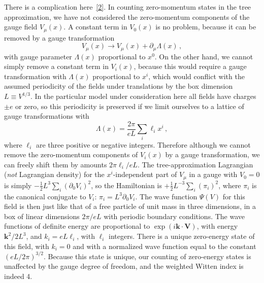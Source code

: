 There is a complication here~\hyperref[ch29-ref-2]{[2]}. In counting
zero-momentum states in the tree approximation, we have not considered the
zero-momentum components of the gauge field \(V_\mu(x)\). A constant term
in \(V_0(x)\) is no problem, because it can be removed by a gauge
transformation
\begin{equation}
  V_\mu(x)\longrightarrow V_\mu(x)+\partial_\mu\Lambda(x)\,,
  \tag{29.4.2}\label{eq:29.4.2}
\end{equation}
with gauge parameter \(\Lambda(x)\) proportional to \(x^0\). On the other
hand, we cannot simply remove a constant term in \(V_i(x)\), because this
would require a gauge transformation with \(\Lambda(x)\) proportional to
\(x^i\), which would conflict with the assumed periodicity of the fields
under translations by the box dimension \(L\equiv V^{1/3}\). In the
particular model under consideration here all fields have charges \(\pm e\)
or zero, so this periodicity is preserved if we limit ourselves to a lattice
of gauge transformations with
\begin{equation}
  \Lambda(x)=\frac{2\pi}{eL}\sum_i\ell_i x^i\,,
  \tag{29.4.3}\label{eq:29.4.3}
\end{equation}
where \(\ell_i\) are three positive or negative integers. Therefore although
we cannot remove the zero-momentum components of \(V_i(x)\) by a gauge
transformation, we can freely shift them by amounts \(2\pi\ell_i/eL\). The
tree-approximation Lagrangian (\emph{not} Lagrangian density) for the
\(x^i\)-independent part of \(V_\mu\) in a gauge with \(V_0=0\) is simply
\(-\frac12L^3\sum_i(\partial_0V_i)^2\), so the Hamiltonian is
\(+\frac12L^{-3}\sum_i(\pi_i)^2\), where \(\pi_i\) is the canonical
conjugate to \(V_i\): \(\pi_i=L^3\partial_0V_i\). The wave function
\(\Psi(V)\) for this field is then just like that of a free particle of unit
mass in three dimensions, in a box of linear dimensions \(2\pi/eL\) with
periodic boundary conditions. The wave functions of definite energy are
proportional to \(\exp(i\mathbf{k}\cdot\mathbf{V})\), with energy
\(\mathbf{k}^2/2L^3\), and \(k_i=eL\ell_i\), with \(\ell_i\) integers.
There is a unique zero-energy state of this field, with \(k_i=0\) and with a
normalized wave function equal to the constant \((eL/2\pi)^{3/2}\).
Because this state is unique, our counting of zero-energy states is
unaffected by the gauge degree of freedom, and the weighted Witten index is
indeed 4.

